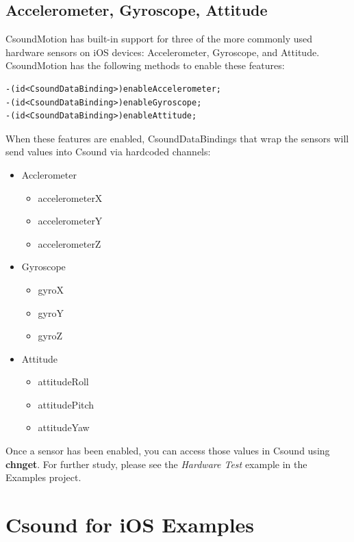 \documentclass[11pt]{article}
\begin{document}
\subsection{Accelerometer, Gyroscope, Attitude}

CsoundMotion has built-in support for three of the more commonly used hardware sensors on iOS devices: Accelerometer, Gyroscope, and Attitude. CsoundMotion has the following methods to enable these features:


\begin{lstlisting}[caption=CsoundMotion Hardware Sensor Methods]
-(id<CsoundDataBinding>)enableAccelerometer;
-(id<CsoundDataBinding>)enableGyroscope;
-(id<CsoundDataBinding>)enableAttitude;
\end{lstlisting}

When these features are enabled, CsoundDataBindings that wrap the sensors will send values into Csound via hardcoded channels:

\begin{itemize}

\item Acclerometer
\begin{itemize}
\item accelerometerX
\item accelerometerY
\item accelerometerZ
\end{itemize}

\item Gyroscope
\begin{itemize}
\item gyroX
\item gyroY
\item gyroZ
\end{itemize}

\item Attitude
\begin{itemize}
\item attitudeRoll
\item attitudePitch
\item attitudeYaw
\end{itemize}

\end{itemize}

Once a sensor has been enabled, you can access those values in Csound using \textbf{chnget}. For further study, please see the \emph{Hardware Test} example in the Examples project.


\section{Csound for iOS Examples}
\end{document}
